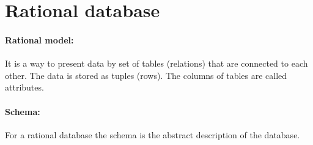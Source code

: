 \documentclass{article}
\begin{document}
\section{Rational database}


\paragraph{Rational model:} It is a way to present data by set of tables (relations) that are connected to each other. The data is stored as tuples (rows). The columns of tables  are called attributes.

\paragraph{Schema:} For a rational database the schema is the abstract description of the database. 
\end{document}
